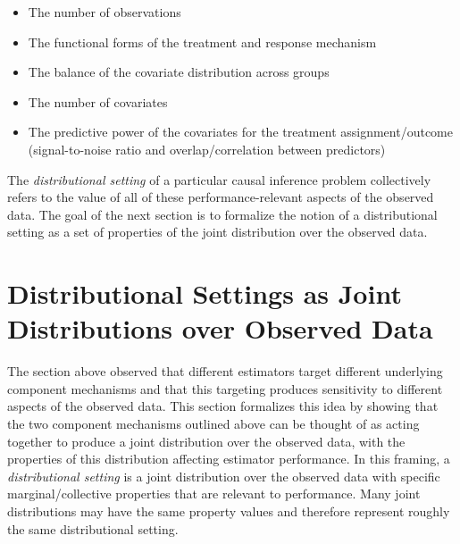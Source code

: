 \documentclass[../main.tex]{subfiles}
\begin{document}
\vspace{\baselineskip}
\begin{itemize}
    \item The number of observations\par

    \item The functional forms of the treatment and response mechanism\par

    \item The balance of the covariate distribution across groups\par

    \item The number of covariates\par

    \item The predictive power of the covariates for the treatment assignment/outcome (signal-to-noise ratio and overlap/correlation between predictors)
\end{itemize}\par


\vspace{\baselineskip}
The \textit{distributional setting} of a particular causal inference problem collectively refers to the value of all of these performance-relevant aspects of the observed data. The goal of the next section is to formalize the notion of a distributional setting as a set of properties of the joint distribution over the observed data.

\section{Distributional Settings as Joint Distributions over Observed Data}

\vspace{\baselineskip}
The section above observed that different estimators target different underlying component mechanisms and that this targeting produces sensitivity to different aspects of the observed data. This section formalizes this idea by showing that the two component mechanisms outlined above can be thought of as acting together to produce a joint distribution over the observed data, with the properties of this distribution affecting estimator performance. In this framing, a \textit{distributional setting }is a joint distribution over the observed data with specific marginal/collective properties that are relevant to performance. Many joint distributions may have the same property values and therefore represent roughly the same distributional setting.\par
\end{document}
